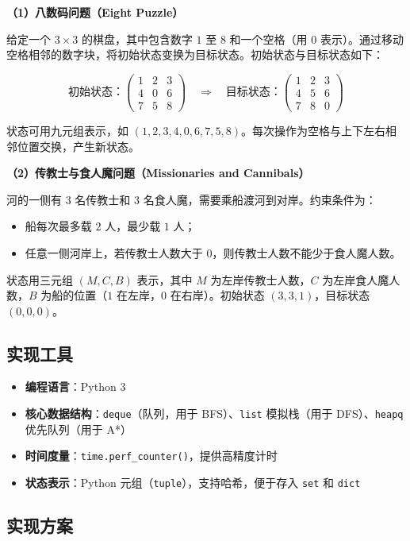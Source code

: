 \documentclass[UTF8]{ctexart}
\begin{document}
\textbf{（1）八数码问题（Eight Puzzle）}

给定一个 $3 \times 3$ 的棋盘，其中包含数字 $1$ 至 $8$ 和一个空格（用 $0$ 表示）。通过移动空格相邻的数字块，将初始状态变换为目标状态。初始状态与目标状态如下：

\[
\text{初始状态：}\begin{pmatrix} 1 & 2 & 3 \\ 4 & 0 & 6 \\ 7 & 5 & 8 \end{pmatrix}
\quad\Longrightarrow\quad
\text{目标状态：}\begin{pmatrix} 1 & 2 & 3 \\ 4 & 5 & 6 \\ 7 & 8 & 0 \end{pmatrix}
\]

状态可用九元组表示，如 $(1,2,3,4,0,6,7,5,8)$。每次操作为空格与上下左右相邻位置交换，产生新状态。

\textbf{（2）传教士与食人魔问题（Missionaries and Cannibals）}

河的一侧有 $3$ 名传教士和 $3$ 名食人魔，需要乘船渡河到对岸。约束条件为：
\begin{itemize}
  \item 船每次最多载 $2$ 人，最少载 $1$ 人；
  \item 任意一侧河岸上，若传教士人数大于 $0$，则传教士人数不能少于食人魔人数。
\end{itemize}
状态用三元组 $(M, C, B)$ 表示，其中 $M$ 为左岸传教士人数，$C$ 为左岸食人魔人数，$B$ 为船的位置（$1$ 在左岸，$0$ 在右岸）。初始状态 $(3,3,1)$，目标状态 $(0,0,0)$。

\subsection{实现工具}

\begin{itemize}
  \item \textbf{编程语言}：Python 3
  \item \textbf{核心数据结构}：\texttt{deque}（队列，用于 BFS）、\texttt{list} 模拟栈（用于 DFS）、\texttt{heapq} 优先队列（用于 A*）
  \item \textbf{时间度量}：\texttt{time.perf\_counter()}，提供高精度计时
  \item \textbf{状态表示}：Python 元组（\texttt{tuple}），支持哈希，便于存入 \texttt{set} 和 \texttt{dict}
\end{itemize}

\subsection{实现方案}
\end{document}
